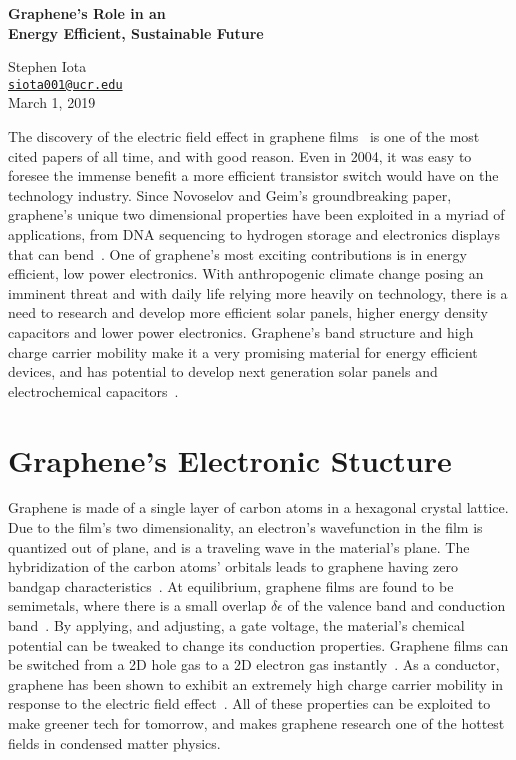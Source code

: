 \documentclass[10pt]{article}
\newcommand{\email}[1]{\texttt{\href{mailto:#1}{#1}}}
\begin{document}
\begin{center}
\Large{\textbf{Graphene's Role in an \\Energy Efficient, Sustainable Future}}
\end{center}
\begin{center}
Stephen Iota
\\
\email{siota001@ucr.edu}
\\
March 1, 2019%
\end{center}



The discovery of the electric field effect in graphene films~\cite{Novoselov2004} is one of the most cited papers of all time, and with good reason.
Even in 2004, it was easy to foresee the immense benefit a more efficient transistor switch would have on the technology industry.
Since Novoselov and Geim's groundbreaking paper, graphene's unique two dimensional properties have been exploited in a myriad of applications, from DNA sequencing to hydrogen storage and electronics displays that can bend~\cite{Drndic2014,Baughman2002,Hong2014}.
One of graphene's most exciting contributions is in energy efficient, low power electronics.
With anthropogenic climate change posing an imminent threat and with daily life relying more heavily on technology, there is a need to research and develop more efficient solar panels, higher energy density capacitors and lower power electronics. Graphene's band structure and high charge carrier mobility make it a very promising material for energy efficient devices, and has potential to develop next generation solar panels and electrochemical capacitors~\cite{Baughman2002,Hong2014,Feng2012,Liu2014}.

\section*{Graphene's Electronic Stucture}

Graphene is made of a single layer of carbon atoms in a hexagonal crystal lattice.
Due to the film's two dimensionality, an electron's wavefunction in the film is quantized out of plane, and is a traveling wave in the material's plane. The hybridization of the carbon atoms' orbitals leads to graphene having zero bandgap characteristics~\cite{Novoselov2004}. At equilibrium, graphene films are found to be semimetals, where there is a small overlap $\delta\epsilon$ of the valence band and conduction band~\cite{Novoselov2004}. By applying, and adjusting, a gate voltage, the material's chemical potential can be tweaked to change its conduction properties. Graphene films can be switched from a 2D hole gas to a 2D electron gas instantly~\cite{Novoselov2004}. As a conductor, graphene has been shown to exhibit an extremely high charge carrier mobility in response to the electric field effect~\cite{Novoselov2004}. All of these properties can be exploited to make greener tech for tomorrow, and makes graphene research one of the hottest fields in condensed matter physics.
\end{document}
